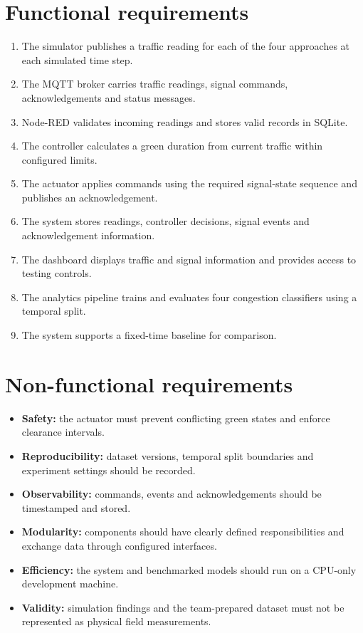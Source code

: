 \documentclass[12pt,a4paper,oneside]{report}
\begin{document}
\section{Functional requirements}
\begin{enumerate}
  \item The simulator publishes a traffic reading for each of the four approaches at each simulated time step.
  \item The MQTT broker carries traffic readings, signal commands, acknowledgements and status messages.
  \item Node-RED validates incoming readings and stores valid records in SQLite.
  \item The controller calculates a green duration from current traffic within configured limits.
  \item The actuator applies commands using the required signal-state sequence and publishes an acknowledgement.
  \item The system stores readings, controller decisions, signal events and acknowledgement information.
  \item The dashboard displays traffic and signal information and provides access to testing controls.
  \item The analytics pipeline trains and evaluates four congestion classifiers using a temporal split.
  \item The system supports a fixed-time baseline for comparison.
\end{enumerate}

\section{Non-functional requirements}
\begin{itemize}
  \item \textbf{Safety:} the actuator must prevent conflicting green states and enforce clearance intervals.
  \item \textbf{Reproducibility:} dataset versions, temporal split boundaries and experiment settings should be recorded.
  \item \textbf{Observability:} commands, events and acknowledgements should be timestamped and stored.
  \item \textbf{Modularity:} components should have clearly defined responsibilities and exchange data through configured interfaces.
  \item \textbf{Efficiency:} the system and benchmarked models should run on a CPU-only development machine.
  \item \textbf{Validity:} simulation findings and the team-prepared dataset must not be represented as physical field measurements.
\end{itemize}
\end{document}
